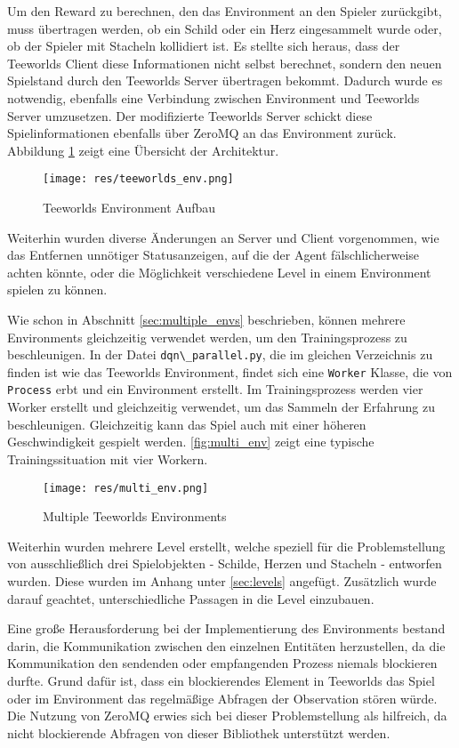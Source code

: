 \documentclass[11pt]{scrartcl}
\begin{document}
\noindent
Um den Reward zu berechnen, den das Environment an den Spieler zurückgibt, muss
übertragen werden, ob ein Schild oder ein Herz eingesammelt wurde oder, ob der Spieler mit
Stacheln kollidiert ist. Es stellte sich heraus, dass der Teeworlds Client diese Informationen
nicht selbst berechnet, sondern den neuen Spielstand durch den Teeworlds Server übertragen bekommt.
Dadurch wurde es notwendig, ebenfalls eine Verbindung zwischen Environment und Teeworlds Server
umzusetzen. Der modifizierte Teeworlds Server schickt diese Spielinformationen ebenfalls über
ZeroMQ an das Environment zurück. Abbildung \ref{fig:teeworlds_env} zeigt eine Übersicht der
Architektur.
\begin{figure}[htp]
  \centering
  \texttt{[image: res/teeworlds\_env.png]}
  \caption{Teeworlds Environment Aufbau}
  \label{fig:teeworlds_env}
\end{figure}


Weiterhin wurden diverse Änderungen an Server und Client vorgenommen, wie das Entfernen
unnötiger Statusanzeigen, auf die der Agent fälschlicherweise achten könnte, oder die
Möglichkeit verschiedene Level in einem Environment spielen zu können.

Wie schon in Abschnitt \ref{sec:multiple_envs} beschrieben, können mehrere Environments
gleichzeitig verwendet werden, um den Trainingsprozess zu beschleunigen. In der Datei
\lstinline!dqn\_parallel.py!, die im gleichen Verzeichnis zu finden ist wie das Teeworlds
Environment, findet sich eine \lstinline!Worker! Klasse, die von \lstinline!Process! erbt
und ein Environment erstellt. Im Trainingsprozess werden vier Worker erstellt und
gleichzeitig verwendet, um das Sammeln der Erfahrung zu beschleunigen. Gleichzeitig kann
das Spiel auch mit einer höheren Geschwindigkeit gespielt werden. \autoref{fig:multi_env}
zeigt eine typische Trainingssituation mit vier Workern.
\begin{figure}[htp]
  \centering
  \texttt{[image: res/multi\_env.png]}
  \caption{Multiple Teeworlds Environments}
  \label{fig:multi_env}
\end{figure}
\noindent

Weiterhin wurden mehrere Level erstellt, welche speziell für die Problemstellung von
ausschließlich drei Spielobjekten - Schilde, Herzen und Stacheln - entworfen wurden.
Diese wurden im Anhang unter \autoref{sec:levels} angefügt. Zusätzlich wurde darauf
geachtet, unterschiedliche Passagen in die Level einzubauen.

Eine große Herausforderung bei der Implementierung des Environments bestand darin, die
Kommunikation zwischen den einzelnen Entitäten herzustellen, da die Kommunikation den
sendenden oder empfangenden Prozess niemals blockieren durfte. Grund dafür ist, dass
ein blockierendes Element in Teeworlds das Spiel oder im Environment das regelmäßige
Abfragen der Observation stören würde. Die Nutzung von ZeroMQ erwies sich bei dieser
Problemstellung als hilfreich, da nicht blockierende Abfragen von dieser Bibliothek
unterstützt werden.
\end{document}
